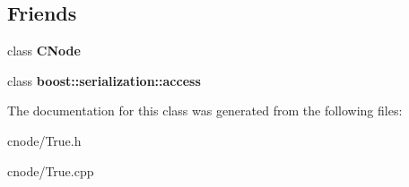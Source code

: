 \subsection*{\-Friends}
\begin{DoxyCompactItemize}
\item 
\hypertarget{classTrue_a0657a422d4ddc5f4a0ff56931b7d2767}{class {\bfseries \-C\-Node}}\label{classTrue_a0657a422d4ddc5f4a0ff56931b7d2767}

\item 
\hypertarget{classTrue_ac98d07dd8f7b70e16ccb9a01abf56b9c}{class {\bfseries boost\-::serialization\-::access}}\label{classTrue_ac98d07dd8f7b70e16ccb9a01abf56b9c}

\end{DoxyCompactItemize}


\-The documentation for this class was generated from the following files\-:\begin{DoxyCompactItemize}
\item 
cnode/\-True.\-h\item 
cnode/\-True.\-cpp\end{DoxyCompactItemize}
